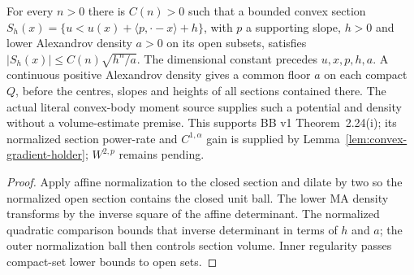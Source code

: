 \begin{lemma}
  \label{lem:convex-section-volume}
  \leanok
  For every $n>0$ there is $C(n)>0$ such that a bounded convex section
  $S_h(x)=\{u<u(x)+\langle p,\cdot-x\rangle+h\}$, with $p$ a supporting slope,
  $h>0$ and lower Alexandrov density $a>0$ on its open subsets, satisfies
  $|S_h(x)|\le C(n)\sqrt{h^n/a}$. The dimensional constant precedes $u,x,p,h,a$.
  A continuous positive Alexandrov density gives a common floor $a$ on each compact $Q$,
  before the centres, slopes and heights of all sections contained there. The actual
  literal convex-body moment source supplies such a potential and density without a
  volume-estimate premise. This supports BB v1 Theorem~2.24(i); its normalized section
  power-rate and $C^{1,\alpha}$ gain is supplied by Lemma~\ref{lem:convex-gradient-holder};
  $W^{2,p}$ remains pending.
\end{lemma}
\begin{proof}
  \leanok
  Apply affine normalization to the closed section and dilate by two so the normalized
  open section contains the closed unit ball. The lower MA density transforms by the
  inverse square of the affine determinant. The normalized quadratic comparison bounds
  that inverse determinant in terms of $h$ and $a$; the outer normalization ball then
  controls section volume. Inner regularity passes compact-set lower bounds to open sets.
\end{proof}


